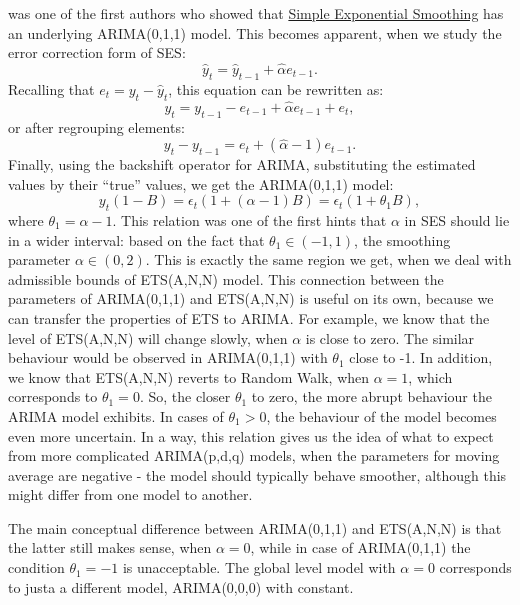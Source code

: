 \documentclass[
]{book}
\theoremstyle{definition}
\theoremstyle{definition}
\theoremstyle{definition}
\theoremstyle{definition}
\theoremstyle{remark}
\begin{document}
\citet{Muth1960} was one of the first authors who showed that \protect\hyperlink{SES}{Simple Exponential Smoothing} has an underlying ARIMA(0,1,1) model. This becomes apparent, when we study the error correction form of SES:
\begin{equation*}
  \hat{y}_{t} = \hat{y}_{t-1} + \hat{\alpha} e_{t-1}.
\end{equation*}
Recalling that \(e_t=y_t-\hat{y}_t\), this equation can be rewritten as:
\begin{equation*}
  y_{t} = y_{t-1} - e_{t-1} + \hat{\alpha} e_{t-1} + e_t,
\end{equation*}
or after regrouping elements:
\begin{equation*}
  y_{t} - y_{t-1} = e_t + (\hat{\alpha} -1) e_{t-1}.
\end{equation*}
Finally, using the backshift operator for ARIMA, substituting the estimated values by their ``true'' values, we get the ARIMA(0,1,1) model:
\begin{equation*}
  y_{t}(1 - B) = \epsilon_t(1 + (\alpha -1) B) = \epsilon_t(1 + \theta_1 B),
\end{equation*}
where \(\theta_1 = \alpha-1\). This relation was one of the first hints that \(\alpha\) in SES should lie in a wider interval: based on the fact that \(\theta_1 \in (-1, 1)\), the smoothing parameter \(\alpha \in (0, 2)\). This is exactly the same region we get, when we deal with admissible bounds of ETS(A,N,N) model. This connection between the parameters of ARIMA(0,1,1) and ETS(A,N,N) is useful on its own, because we can transfer the properties of ETS to ARIMA. For example, we know that the level of ETS(A,N,N) will change slowly, when \(\alpha\) is close to zero. The similar behaviour would be observed in ARIMA(0,1,1) with \(\theta_1\) close to -1. In addition, we know that ETS(A,N,N) reverts to Random Walk, when \(\alpha=1\), which corresponds to \(\theta_1=0\). So, the closer \(\theta_1\) to zero, the more abrupt behaviour the ARIMA model exhibits. In cases of \(\theta_1>0\), the behaviour of the model becomes even more uncertain. In a way, this relation gives us the idea of what to expect from more complicated ARIMA(p,d,q) models, when the parameters for moving average are negative - the model should typically behave smoother, although this might differ from one model to another.

The main conceptual difference between ARIMA(0,1,1) and ETS(A,N,N) is that the latter still makes sense, when \(\alpha=0\), while in case of ARIMA(0,1,1) the condition \(\theta_1=-1\) is unacceptable. The global level model with \(\alpha=0\) corresponds to justa a different model, ARIMA(0,0,0) with constant.
\end{document}
